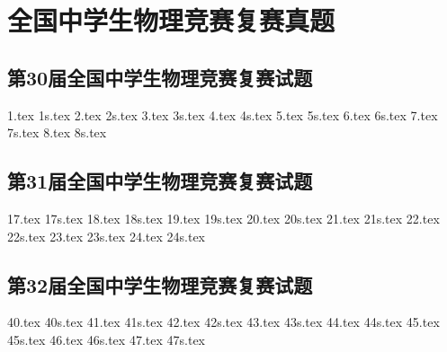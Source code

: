 \chapter{全国中学生物理竞赛复赛真题}
\section{第30届全国中学生物理竞赛复赛试题}
{1.tex}
{1s.tex}
{2.tex}
{2s.tex}
{3.tex}
{3s.tex}
{4.tex}
{4s.tex}
{5.tex}
{5s.tex}
{6.tex}
{6s.tex}
{7.tex}
{7s.tex}
{8.tex}
{8s.tex}
\newpage
\section{第31届全国中学生物理竞赛复赛试题}
{17.tex}
{17s.tex}
{18.tex}
{18s.tex}
{19.tex}
{19s.tex}
{20.tex}
{20s.tex}
{21.tex}
{21s.tex}
{22.tex}
{22s.tex}
{23.tex}
{23s.tex}
{24.tex}
{24s.tex}
\newpage
\section{第32届全国中学生物理竞赛复赛试题}
{40.tex}
{40s.tex}
{41.tex}
{41s.tex}
{42.tex}
{42s.tex}
{43.tex}
{43s.tex}
{44.tex}
{44s.tex}
{45.tex}
{45s.tex}
{46.tex}
{46s.tex}
{47.tex}
{47s.tex}
